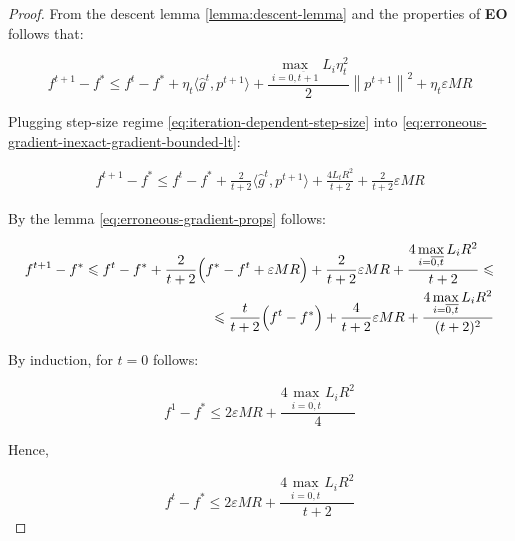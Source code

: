 \documentclass[runningheads, draft]{llncs}
\newcommand{\norm}[1]{\left\lVert#1\right\rVert}
\newcommand{\vprod}[1]{\langle#1\rangle}
\newcommand{\errgrad}{\hat{g}}
\begin{document}
\begin{proof}
    From the descent lemma \eqref{lemma:descent-lemma} and
    the properties of \textbf{EO} follows that:

    \begin{equation}\label{eq:erroneous-gradient-inexact-gradient-bounded-lt}
        f^{t+1} - f^* \leqslant f^t - f^* + \eta_t \vprod{\errgrad^t, p^{t+1}} +
        \frac{\max\limits_{i=\overline{0,t+1}}L_i \eta_t^2}{2} \norm{p^{t+1}}^2
        + \eta_t \varepsilon M R
    \end{equation}

    Plugging step-size regime \eqref{eq:iteration-dependent-step-size} into
    \eqref{eq:erroneous-gradient-inexact-gradient-bounded-lt}:

    \begin{equation}
        \begin{split}
            f^{t+1} - f^* \leqslant f^t - f^* + \frac{2}{t+2}
            \vprod{\errgrad^t, p^{t+1}} + \frac{4 L_t R^2}{t + 2} +
            \frac{2}{t + 2}\varepsilon M R
        \end{split}
    \end{equation}

    By the lemma \eqref{eq:erroneous-gradient-props} follows:

    \begin{equation}\label{eq:aecg-convergence-rate-proof-bounded-lt}
        \begin{split}
            f^{t+1} - f^* \leqslant f^t - f^* + \frac{2}{t+2}
            \Bigl(f^* - f^t + \varepsilon M R\Bigr) +
            \frac{2}{t + 2}\varepsilon M R +
            \frac{4 \max\limits_{i=\overline{0,t}}L_i R^2}{t + 2} \leqslant \\
            \leqslant \frac{t}{t + 2}\Bigl(f^t - f^*\Bigr)+
            \frac{4}{t + 2}\varepsilon M R +
            \frac{4 \max\limits_{i=\overline{0,t}}L_i R^2}{(t + 2)^2}
        \end{split}
    \end{equation}

    By induction, for $t = 0$ follows:

    \begin{equation}
        f^1 - f^* \leqslant 2\varepsilon M R +
        \frac{4 \max\limits_{i=\overline{0,t}}L_i R^2}{4}
    \end{equation}

    Hence,

    \begin{equation}\label{eq:induction-assumption-bounded-lt}
        f^t - f^* \leqslant 2\varepsilon M R +
        \frac{4 \max\limits_{i=\overline{0,t}}L_i R^2}{t + 2}
    \end{equation}


\end{proof}
\end{document}
